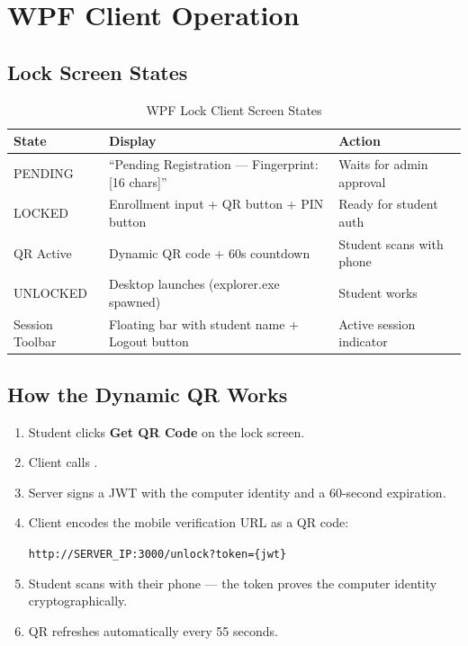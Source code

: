 \section{WPF Client Operation}

\subsection{Lock Screen States}

\begin{table}[h!]
\centering
\caption{WPF Lock Client Screen States}
\label{tab:client-states}
\begin{tabularx}{\textwidth}{lXl}
\toprule
\textbf{State} & \textbf{Display} & \textbf{Action}\\
\midrule
\rowcolor{aurxonlightgray}
PENDING & ``Pending Registration — Fingerprint: [16 chars]'' & Waits for admin approval\\
LOCKED & Enrollment input + QR button + PIN button & Ready for student auth\\
\rowcolor{aurxonlightgray}
QR Active & Dynamic QR code + 60s countdown & Student scans with phone\\
UNLOCKED & Desktop launches (explorer.exe spawned) & Student works\\
\rowcolor{aurxonlightgray}
Session Toolbar & Floating bar with student name + Logout button & Active session indicator\\
\bottomrule
\end{tabularx}
\end{table}

\subsection{How the Dynamic QR Works}

\begin{enumerate}[leftmargin=*, label=\textbf{\arabic*.}]
  \item Student clicks \textbf{Get QR Code} on the lock screen.
  \item Client calls .
  \item Server signs a JWT with the computer identity and a 60-second expiration.
  \item Client encodes the mobile verification URL as a QR code:
    \begin{center}
    \texttt{http://SERVER\_IP:3000/unlock?token=\{jwt\}}
    \end{center}
  \item Student scans with their phone — the token proves the computer identity cryptographically.
  \item QR refreshes automatically every 55 seconds.
\end{enumerate}

